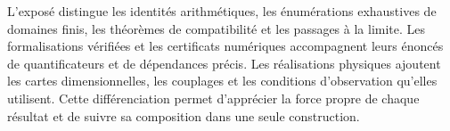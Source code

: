 L’exposé distingue les identités arithmétiques, les énumérations exhaustives de domaines finis, les théorèmes de compatibilité et les passages à la limite. Les formalisations vérifiées et les certificats numériques accompagnent leurs énoncés de quantificateurs et de dépendances précis. Les réalisations physiques ajoutent les cartes dimensionnelles, les couplages et les conditions d’observation qu’elles utilisent. Cette différenciation permet d’apprécier la force propre de chaque résultat et de suivre sa composition dans une seule construction.
